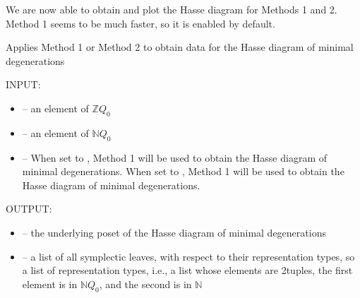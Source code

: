 \documentclass[letterpaper,10pt,english]{sphinxmanual}
\begin{document}
\sphinxAtStartPar
We are now able to obtain and plot the Hasse diagram for Methods 1 and 2. Method 1 seems to be much faster, so it is enabled by default.

\begin{fulllineitems}
\label{\detokenize{index:quivercombinatorics.quivercombinatorics.Quiver.get_Hasse_diagram}}
\pysigstartsignatures
\pysiglinewithargsret
{}
{\sphinxparamcomma {}\sphinxparamcomma {}}
{}
\pysigstopsignatures
\sphinxAtStartPar
Applies Method 1 or Method 2 to obtain data for the Hasse diagram of minimal degenerations

\sphinxAtStartPar
INPUT:
\begin{itemize}
\item {} 
\sphinxAtStartPar
{} – an element of \(\mathbb{Z}Q_0\)

\item {} 
\sphinxAtStartPar
{} – an element of \(\mathbb{N}Q_0\)

\item {} 
\sphinxAtStartPar
{} – When set to , Method 1 will be used to obtain the Hasse diagram of minimal degenerations. When set to , Method 1 will be used to obtain the Hasse diagram of minimal degenerations.

\end{itemize}

\sphinxAtStartPar
OUTPUT:
\begin{itemize}
\item {} 
\sphinxAtStartPar
{} – the underlying poset of the Hasse diagram of minimal degenerations

\item {} 
\sphinxAtStartPar
{} – a list of all symplectic leaves, with respect to their representation types, so a list of representation types, i.e., a list whose elements are 2\sphinxhyphen{}tuples, the first element is in \(\mathbb{N}Q_0\), and the second is in \(\mathbb{N}\)


\end{itemize}
\end{fulllineitems}
\end{document}

